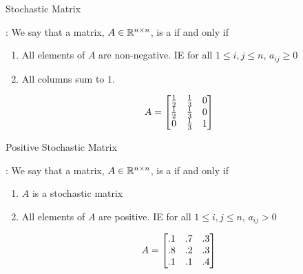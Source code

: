 \documentclass[xcoler=dvipsnames, aspectratio=169]{beamer}
\date{Brief Markov Chains Introduction}
\begin{document}
    \begin{frame}{Stochastic Matrix}
        \begin{defn}
            : We say that a matrix, $A\in\mathbb{R}^{n\times n}$, is a 
             if and only if
            \begin{enumerate}
                \pause\item All elements of $A$ are non-negative. 
                    IE for all $1\leq i,j\leq n$, $a_{ij}\geq 0$
                \pause\item All columns sum to $1$.
            \end{enumerate}
        \end{defn}\pause
        \begin{example}
            \[
                A = \begin{bmatrix}
                    \frac{1}{2} & \frac{1}{3} & 0\\
                    \frac{1}{2} & \frac{1}{3} & 0\\
                    0 & \frac{1}{3} & 1
                \end{bmatrix}
            \]
        \end{example}
    \end{frame}
    \begin{frame}{Positive Stochastic Matrix}
        \begin{defn}
            : We say that a matrix, $A\in\mathbb{R}^{n\times n}$, is a
             if and only if 
            \begin{enumerate}
                \pause\item $A$ is a stochastic matrix
                \pause\item All elements of $A$ are positive.
                    IE for all $1\leq i,j\leq n$, $a_{ij}> 0$
            \end{enumerate}
        \end{defn}\pause
        \begin{example}
            \[
                A = \begin{bmatrix}
                    .1 & .7 & .3\\
                    .8 & .2 & .3\\
                    .1 & .1 & .4
                \end{bmatrix}
            \]
        \end{example}
    \end{frame}
\end{document}
